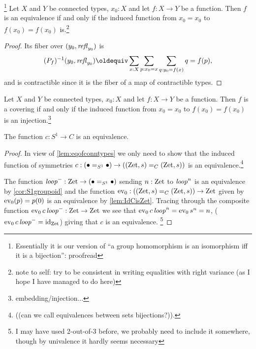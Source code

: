 \begin{lemma}\label{lem:eqofconntypes}\footnote{
Essentially it is our version of ``a group homomorphism is an isomorphism iff it is a bijection'': proofread}
  Let $X$ and $Y$ be connected types, $x_0:X$ and let $f:X\to Y$ be a function.  Then $f$ is an equivalence if and only if the induced function from $x_0=x_0$ to $f(x_0)=f(x_0)$ is.\footnote{note to self: try to be consistent in writing equalities with right variance (as I hope I have managed to do here)}
\end{lemma}
\begin{proof}
  

 Its fiber over $(y_0,\mathop{{\it refl}_{y_0}})$ is 
$$(P_f)^{-1}(y_0,\refl{y_0})\oldequiv\sum_{x:X}\sum_{p:x_0=x}\sum_{q:y_0=f(x)}q=f(p),$$ and is contractible since it is the fiber of a map of contractible types.  
\end{proof}
\begin{lemma}
  Let $X$ and $Y$ be connected types, $x_0:X$ and let $f:X\to Y$ be a function.  Then $f$ is a covering if and only if the induced function from $x_0=x_0$ to $f(x_0)=f(x_0)$ is an injection.\footnote{embedding/injection...}
\end{lemma}



\begin{theorem}\label{thm:S1bysymmetries}
  The function $c:S^1\to C$ is an equivalence.
\end{theorem}
\begin{proof}
  In view of \cref{lem:eqofconntypes} we only need to show that the induced function of symmetries $c:(\bullet=_{S^1}\bullet)\to((\mathrm{Zet},s)=_C(\mathrm{Zet},s))$ is an equivalence.\footnote{ ((can we call equivalences between sets bijections?)).}  

The function $\mathit{loop}^-:\mathrm{Zet}\to (\bullet=_{S^1}\bullet)$ sending $n:\mathrm{Zet}$ to $\mathit{loop}^n$ is an equivalence by  \cref{cor:S1groupoid} and the function  $\mathrm{ev}_0:((\mathrm{Zet},s)=_C(\mathrm{Zet},s))\to \mathrm{Zet}$ given by $\mathrm{ev}_0(p)=p(0)$ is an equivalence by \cref{lem:IdCisZet}.  Tracing through the composite function $\mathrm{ev}_0\,c\,\mathit{loop}^-:\mathrm{Zet}\to\mathrm{Zet}$ we see that $\mathrm{ev}_0\,c\,\mathit{loop}^n=\mathrm{ev}_0\,s^n=n$, (\ie $\mathrm{ev}_0\,c\,\mathit{loop}^-=\mathord{\mathrm{id}}_{\mathrm{Zet}}$) giving that $c$ is an equivalence. 
\footnote{I may have used 2-out-of-3 before, we probably need to include it somewhere, though by univalence it hardly seems necessary}%
\end{proof}

